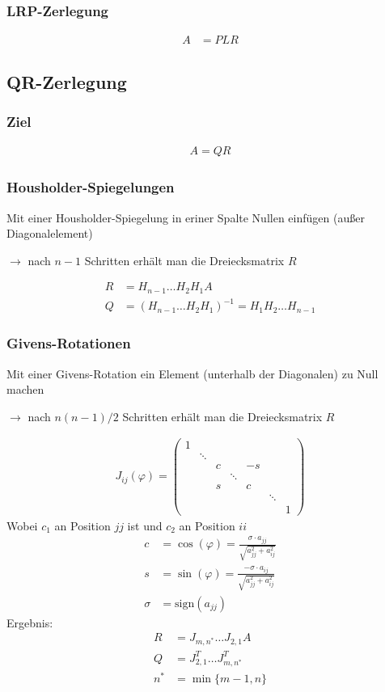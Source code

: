 \subsubsection{LRP-Zerlegung}
\begin{align*}
	A &= PLR
\end{align*}
\subsection{QR-Zerlegung}
\subsubsection{Ziel}
\begin{align*}
	A = QR
\end{align*}
\subsubsection{Housholder-Spiegelungen}
Mit einer Housholder-Spiegelung in eriner Spalte Nullen einfügen (außer Diagonalelement)

$\to$ nach $n-1$ Schritten erhält man die Dreiecksmatrix $R$

\begin{align*}
	R &= H_{n-1}\dots H_2H_1A \\
	Q &= (H_{n-1}\dots H_2H_1)^{-1} = H_1 H_2 \dots H_{n-1}
\end{align*}
\subsubsection{Givens-Rotationen}
Mit einer Givens-Rotation ein Element (unterhalb der Diagonalen) zu Null machen

$\to$ nach $n(n-1)/2$ Schritten erhält man die Dreiecksmatrix $R$

\begin{align*}
	J_{ij}(\varphi)=\begin{pmatrix}
		1 \\
		& \ddots \\
		& & c & &-s \\
		& &  &\ddots \\
		& & s & & c \\
		& & & & & \ddots \\
		& & & & & & 1
	\end{pmatrix}
\end{align*}
Wobei $c_1$ an Position $jj$ ist und $c_2$ an Position $ii$
\begin{align*}
	c &= \cos(\varphi) = \frac{\sigma\cdot a_{jj}}{\sqrt{a^2_{jj}+a^2_{ij}}} \\
	s &= \sin(\varphi)=\frac{-\sigma\cdot a_{ij}}{\sqrt{a^2_{jj}+a^2_{ij}}} \\
	\sigma &= \text{sign}(a_{jj})
\end{align*}
Ergebnis:
\begin{align*}
	R &= J_{m,n^*}\dots J_{2,1}A \\
	Q &= J_{2,1}^T\dots J_{m,n^*}^T \\
	n^* &= \min\{m-1, n\}
\end{align*}
